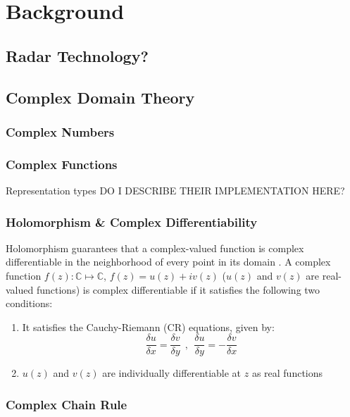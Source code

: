 \chapter{Background}\label{chap:comp}
\section{Radar Technology?}


\section{Complex Domain Theory}

\subsection{Complex Numbers}
\subsection{Complex Functions}




Representation types
DO I DESCRIBE THEIR IMPLEMENTATION HERE?

\subsection{Holomorphism \& Complex Differentiability}

Holomorphism guarantees that a complex-valued function is complex differentiable in the neighborhood of every point in its domain \cite{trabelsi2018deep}.
A complex function $f(z): \mathbb{C} \mapsto \mathbb{C}$, $f(z)= u(z) + iv(z)$ ($u(z)$ and $v(z)$ are real-valued functions) is complex differentiable if it satisfies the following two conditions:
\begin{enumerate}

	\item It satisfies the Cauchy-Riemann (CR) equations, given by:
\begin{equation}\label{eq:compdiff}
\frac{\delta u}{\delta x} = \frac{\delta v}{\delta y} ~~,~~ \frac{\delta u}{\delta y} = - \frac{\delta v}{\delta x} 
\end{equation}
	\item $u(z)$ and $v(z)$ are individually differentiable at $z$ as real functions	
\end{enumerate} 


 
\subsection{Complex Chain Rule}



